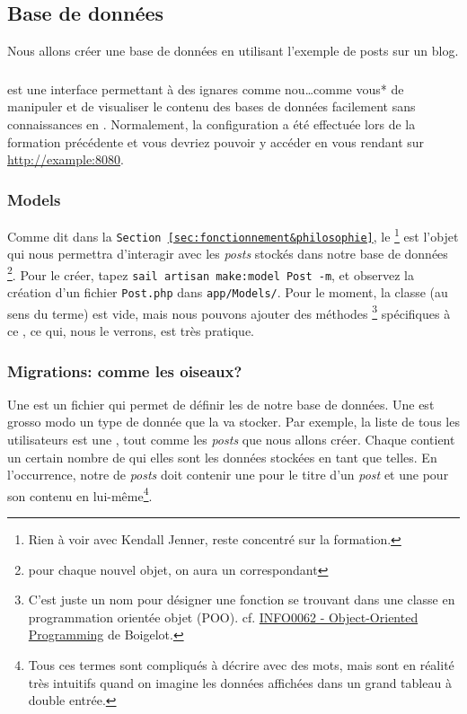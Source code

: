 \subsection{Base de données}
Nous allons créer une base de données en utilisant l'exemple de posts sur un blog.


\subsubsection[PHPMyAdmin][]{\phpmyadmin{}}
\phpmyadmin{} est une interface permettant à des ignares comme nou\ldots comme vous* de manipuler et de visualiser le contenu des bases de données facilement sans connaissances en \mysql. Normalement, la configuration a été effectuée lors de la formation précédente et vous devriez pouvoir y accéder en vous rendant sur \url{http://example:8080}.

\subsubsection[Models][laravel.com/docs/12.x/eloquent\#generating-model-classes]{Models}
Comme dit dans la \texttt{Section~\ref{sec:fonctionnement&philosophie}}, le \model{} \footnote{Rien à voir avec Kendall Jenner, reste concentré sur la formation.} est l'objet qui nous permettra d'interagir avec les \textit{posts} stockés dans notre base de données \footnote{pour chaque nouvel objet, on aura un \model{} correspondant}. Pour le créer, tapez \verb|sail artisan make:model Post -m|, et observez la création d'un fichier \verb|Post.php| dans \verb|app/Models/|. Pour le moment, la classe (au sens \php{} du terme) est vide, mais nous pouvons ajouter des méthodes \footnote{C'est juste un nom pour désigner une fonction se trouvant dans une classe en programmation orientée objet (POO). cf. \href{https://people.montefiore.uliege.be/boigelot/cours/oop/index.html}{INFO0062 - Object-Oriented Programming} de Boigelot.} spécifiques à ce \model{}, ce qui, nous le verrons, est très pratique.

\subsubsection[Migrations: théorie][laravel.com/docs/12.x/migrations\#introduction]{Migrations: comme les oiseaux?}

Une \migration{} est un fichier qui permet de définir les \tables{} de notre base de données. Une \table{} est grosso modo un type de donnée que la \db{} va stocker. Par exemple, la liste de tous les utilisateurs est une \table{}, tout comme les \textit{posts} que nous allons créer. Chaque \table{} contient un certain nombre de \columns{} qui elles sont les données stockées en tant que telles. En l'occurrence, notre \table{} de \textit{posts} doit contenir une \column{} pour le titre d'un \textit{post} et une pour son contenu en lui-même\footnote{Tous ces termes sont compliqués à décrire avec des mots, mais sont en réalité très intuitifs quand on imagine les données affichées dans un grand tableau à double entrée.}.

